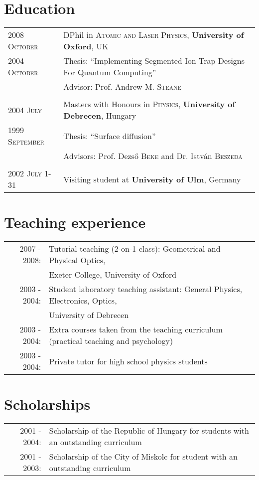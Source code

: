 \documentclass[10pt]{article}
\begin{document}
\section{Education}
\begin{tabular}{p{3cm}|p{11cm}}	
 \textsc{2008 October}& DPhil in \textsc{Atomic and Laser Physics}, \textbf{University of Oxford}, UK\\
 \textsc{2004 October} & Thesis: ``Implementing Segmented Ion Trap Designs For Quantum Computing'' \\ & \small Advisor: Prof. Andrew M. \textsc{Steane}\\\multicolumn{2}{c}{} \\

\textsc{2004 July} & Masters with Honours in \textsc{Physics}, \textbf{University of Debrecen}, Hungary\\
\textsc{1999 September} & Thesis: ``Surface diffusion'' \\ & \small Advisors: Prof. Dezs\H{o} \textsc{Beke} and Dr. Istv\'an \textsc{Beszeda}\\\multicolumn{2}{c}{} \\

\textsc{2002 July 1-31}& Visiting student at \textbf{University of Ulm}, Germany
\end{tabular}

\section{Teaching experience}
\begin{tabular}{rl}
\textsc{2007 - 2008:} & Tutorial teaching (2-on-1 class): Geometrical and Physical Optics,\\& Exeter College, University of Oxford \\
\textsc{2003 - 2004:} & Student laboratory teaching assistant: General Physics, Electronics, Optics,\\& University of Debrecen \\
\textsc{2003 - 2004:} & Extra courses taken from the teaching curriculum (practical teaching and psychology)\\
\textsc{2003 - 2004:} & Private tutor for high school physics students
\end{tabular}

\section{Scholarships}
\begin{tabular}{rl}
\textsc{2001 - 2004:} & Scholarship of the Republic of Hungary for students with an outstanding curriculum\\
\textsc{2001 - 2003:} & Scholarship of the City of Miskolc for student with an outstanding curriculum
\end{tabular}
\end{document}
